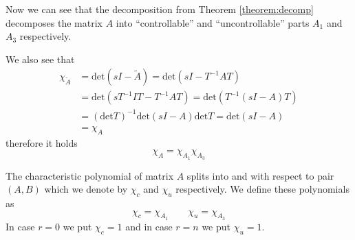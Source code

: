 Now we can see that the decomposition from Theorem \ref{theorem:decomp} decomposes the matrix $A$ into ``controllable'' and ``uncontrollable'' parts $A_1$ and $A_3$ respectively.

We also see that 
\begin{align*}
	\chi_{\widetilde{A}}&=\text{det}(sI-\widetilde{A})=\text{det}(sI-T^{-1}AT) \\
	&=\text{det}(sT^{-1}IT-T^{-1}AT)=\text{det}(T^{-1}(sI-A)T) \\
	&=(\text{det}T)^{-1}\text{det}(sI-A)\text{det}T=\text{det}(sI-A) \\
	&=\chi_A
\end{align*}
therefore it holds $$\chi_A=\chi_{A_1}\chi_{A_3}$$ 

\begin{definition}
	The characteristic polynomial of matrix $A$ splits into  and  with respect to pair $(A,B)$ which we denote by $\chi_c$ and $\chi_u$ respectively. We define these polynomials as $$\chi_c=\chi_{A_1} \qquad \chi_u=\chi_{A_3}$$ In case $r=0$ we put $\chi_c=1$ and in case $r=n$ we put $\chi_u=1$.
\end{definition}